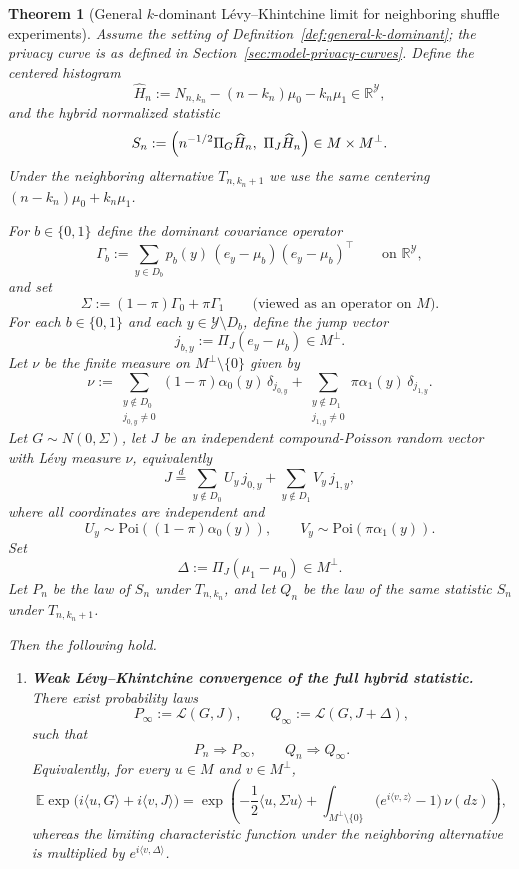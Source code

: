 \documentclass{article}
\newtheorem{theorem}{Theorem}[section]
\newcommand{\1}{\mathbf 1}
\begin{document}
\begin{theorem}[General $k$-dominant L\'evy--Khintchine limit for neighboring shuffle experiments]
\label{thm:general-k-dominant-LK}
Assume the setting of Definition~\ref{def:general-k-dominant}; the privacy curve is as defined in
Section~\ref{sec:model-privacy-curves}.
Define the centered histogram
\[
\widehat H_n
:=
N_{n,k_n}-(n-k_n)\mu_0-k_n\mu_1\in\mathbb R^{\mathcal Y},
\]
and the hybrid normalized statistic
\[
S_n
:=
\Bigl(n^{-1/2}\Pi_G\widehat H_n,\ \Pi_J\widehat H_n\Bigr)
\in M\times M^\perp.
\]
Under the neighboring alternative $T_{n,k_n+1}$ we use the \emph{same} centering
$(n-k_n)\mu_0+k_n\mu_1$.

For $b\in\{0,1\}$ define the dominant covariance operator
\[
\Gamma_b
:=
\sum_{y\in D_b} p_b(y)\,(e_y-\mu_b)(e_y-\mu_b)^\top
\qquad\text{on }\mathbb R^{\mathcal Y},
\]
and set
\[
\Sigma:=(1-\pi)\Gamma_0+\pi\Gamma_1
\qquad\text{(viewed as an operator on }M\text{)}.
\]
For each $b\in\{0,1\}$ and each $y\in\mathcal Y\setminus D_b$, define the jump vector
\[
j_{b,y}:=\Pi_J(e_y-\mu_b)\in M^\perp.
\]
Let $\nu$ be the finite measure on $M^\perp\setminus\{0\}$ given by
\[
\nu
:=
\sum_{\substack{y\notin D_0\\ j_{0,y}\neq 0}}
(1-\pi)\alpha_0(y)\,\delta_{j_{0,y}}
+
\sum_{\substack{y\notin D_1\\ j_{1,y}\neq 0}}
\pi\alpha_1(y)\,\delta_{j_{1,y}}.
\]
Let $G\sim N(0,\Sigma)$, let $J$ be an independent compound-Poisson random vector with L\'evy measure
$\nu$, equivalently
\[
J\overset d=
\sum_{y\notin D_0} U_y\,j_{0,y}
+
\sum_{y\notin D_1} V_y\,j_{1,y},
\]
where all coordinates are independent and
\[
U_y\sim \mathrm{Poi}((1-\pi)\alpha_0(y)),
\qquad
V_y\sim \mathrm{Poi}(\pi\alpha_1(y)).
\]
Set
\[
\Delta:=\Pi_J(\mu_1-\mu_0)\in M^\perp.
\]
Let $P_n$ be the law of $S_n$ under $T_{n,k_n}$, and let $Q_n$ be the law of the same statistic $S_n$
under $T_{n,k_n+1}$.

Then the following hold.

\begin{enumerate}
\item[(i)] \textbf{Weak L\'evy--Khintchine convergence of the full hybrid statistic.}
There exist probability laws
\[
P_\infty:=\mathcal L(G,J),
\qquad
Q_\infty:=\mathcal L(G,J+\Delta),
\]
such that
\[
P_n \Longrightarrow P_\infty,
\qquad
Q_n \Longrightarrow Q_\infty.
\]
Equivalently, for every $u\in M$ and $v\in M^\perp$,
\[
\mathbb E\exp\!\bigl(i\langle u,G\rangle+i\langle v,J\rangle\bigr)
=
\exp\!\left(
-\frac12\langle u,\Sigma u\rangle
+
\int_{M^\perp\setminus\{0\}}
\bigl(e^{i\langle v,z\rangle}-1\bigr)\,\nu(dz)
\right),
\]
whereas the limiting characteristic function under the neighboring alternative is multiplied by
$e^{i\langle v,\Delta\rangle}$.


\end{enumerate}
\end{theorem}
\end{document}
